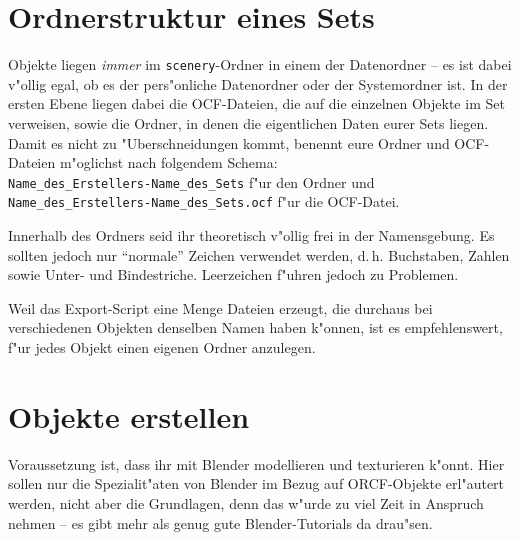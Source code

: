 \documentclass[a4paper]{article}
\newcommand{\cfile}[1]{\texttt{#1}}
\begin{document}
\section{Ordnerstruktur eines Sets}
\label{directories}
Objekte liegen \emph{immer} im \cfile{scenery}-Ordner in einem der Datenordner -- es ist dabei v"ollig egal, ob es der pers"onliche Datenordner oder der
Systemordner ist. In der ersten Ebene liegen dabei die OCF-Dateien, die auf die einzelnen Objekte im Set
verweisen, sowie die Ordner, in denen die eigentlichen Daten eurer Sets liegen. Damit es nicht zu "Uberschneidungen kommt, benennt eure Ordner und
OCF-Dateien m"oglichst nach folgendem Schema:\\
\cfile{Name\_des\_Erstellers-Name\_des\_Sets} f"ur den Ordner und \\
\cfile{Name\_des\_Erstellers-Name\_des\_Sets.ocf} f"ur die OCF-Datei.

Innerhalb des Ordners seid ihr theoretisch v"ollig frei in der Namensgebung. Es sollten jedoch nur "`normale"' Zeichen verwendet werden, d.\,h.
Buchstaben, Zahlen sowie Unter- und Bindestriche. Leerzeichen f"uhren jedoch zu Problemen.

Weil das Export-Script eine Menge Dateien erzeugt, die durchaus bei verschiedenen Objekten denselben Namen haben k"onnen, ist es empfehlenswert, f"ur
jedes Objekt einen eigenen Ordner anzulegen.

\section{Objekte erstellen}
Voraussetzung ist, dass ihr mit Blender modellieren und texturieren k"onnt. Hier sollen nur die Spezialit"aten von Blender im Bezug auf ORCF-Objekte
erl"autert werden, nicht aber die Grundlagen, denn das w"urde zu viel Zeit in Anspruch nehmen -- es gibt mehr als genug gute Blender-Tutorials da
drau"sen.
\end{document}
